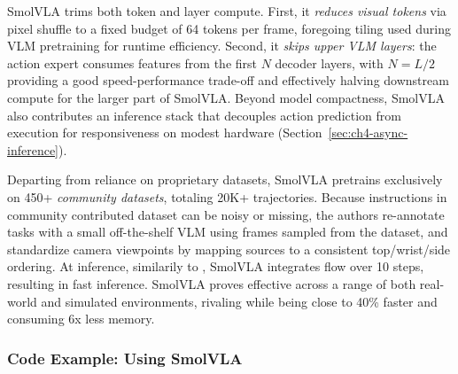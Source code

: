 SmolVLA trims both token and layer compute. 
First, it \emph{reduces visual tokens} via pixel shuffle to a fixed budget of 64 tokens per frame, foregoing tiling used during VLM pretraining for runtime efficiency. 
Second, it \emph{skips upper VLM layers}: the action expert consumes features from the first \(N\) decoder layers, with \(N=L/2\) providing a good speed-performance trade-off and effectively halving downstream compute for the larger part of SmolVLA.
Beyond model compactness, SmolVLA also contributes an inference stack that decouples action prediction from execution for responsiveness on modest hardware (Section~\ref{sec:ch4-async-inference}).

Departing from reliance on proprietary datasets, SmolVLA pretrains exclusively on 450+ \emph{community datasets}, totaling 20K+ trajectories. 
Because instructions in community contributed dataset can be noisy or missing, the authors re-annotate tasks with a small off-the-shelf VLM using frames sampled from the dataset, and standardize camera viewpoints by mapping sources to a consistent top/wrist/side ordering.
At inference, similarily to \pizero, SmolVLA integrates flow over 10 steps, resulting in fast inference.
SmolVLA proves effective across a range of both real-world and simulated environments, rivaling \pizero while being close to 40\% faster and consuming 6x less memory.

\subsubsection{Code Example: Using SmolVLA}

